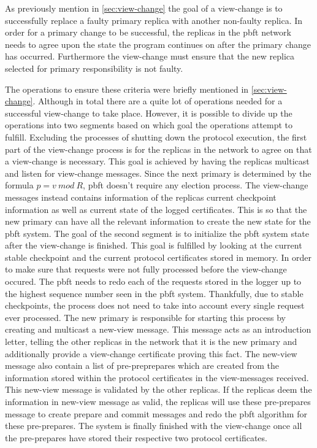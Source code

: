 \iffalse
As previously mention in \autoref{sec:view-change} the goal of a view-change is to successfully replace a faulty primary replica with another non-faulty replica. In order for a primary change to be successful, the replicas in the \ac{pbft} network needs to agree upon the state the program continues on after the primary change has occurred. Furthermore the view-change must ensure that the new replica selected for primary responsibility is not faulty. 

The operations to ensure these criteria were briefly mentioned in \autoref{sec:view-change}. Although in total there are a quite lot of operations needed for a successful view-change to take place. However, it is possible to divide up the operations into two segments based on which goal the operations attempt to fulfill. Excluding the processes of shutting down the protocol execution, the first part of the view-change process is for the replicas in the network to agree on that a view-change is necessary. This goal is achieved by having the replicas multicast and listen for view-change messages. Since the next primary is determined by the formula $p = v ~mod~ R$, \ac{pbft} doesn't require any election process. The view-change messages instead contains information of the replicas current checkpoint information as well as current state of the logged certificates. This is so that the new primary can have all the relevant information to create the new state for the \ac{pbft} system. The goal of the second segment is to initialize the \ac{pbft} system state after the view-change is finished. This goal is fulfilled by looking at the current stable checkpoint and the current protocol certificates stored in memory. In order to make sure that requests were not fully processed before the view-change occured. The \ac{pbft} needs to redo each of the requests stored in the logger up to the highest sequence number seen in the \ac{pbft} system. Thankfully, due to stable checkpoints, the process does not need to take into account every single request ever processed. The new primary is responsible for starting this process by creating and multicast a new-view message. This message acts as an introduction letter, telling the other replicas in the network that it is the new primary and additionally provide a view-change certificate proving this fact. The new-view message also contain a list of pre-preprepares which are created from the information stored within the protocol certificates in the view-messages received. This new-view message is validated by the other replicas. If the replicas deem the information in new-view message as valid, the replicas will use these pre-prepares message to create prepare and commit messages and redo the \ac{pbft} algorithm for these pre-prepares. The system is finally finished with the view-change once all the pre-prepares have stored their respective two protocol certificates. 

